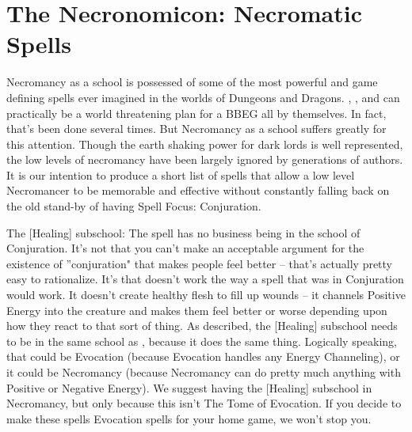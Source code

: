 \section{The Necronomicon: Necromatic Spells}

Necromancy as a school is possessed of some of the most powerful and game defining spells ever imagined in the worlds of Dungeons and Dragons. , , and  can practically be a world threatening plan for a BBEG all by themselves. In fact, that's been done several times. But Necromancy as a school suffers greatly for this attention. Though the earth shaking power for dark lords is well represented, the low levels of necromancy have been largely ignored by generations of authors. It is our intention to produce a short list of spells that allow a low level Necromancer to be memorable and effective without constantly falling back on the old stand-by of having Spell Focus: Conjuration.

The [Healing] subschool:
The spell  has no business being in the school of Conjuration. It's not that you can't make an acceptable argument for the existence of ''conjuration" that makes people feel better -- that's actually pretty easy to rationalize. It's that  doesn't work the way a spell that was in Conjuration would work. It doesn't create healthy flesh to fill up wounds -- it channels Positive Energy into the creature and makes them feel better or worse depending upon how they react to that sort of thing. As described, the [Healing] subschool needs to be in the same school as , because it does the same thing. Logically speaking, that could be Evocation (because Evocation handles any Energy Channeling), or it could be Necromancy (because Necromancy can do pretty much anything with Positive or Negative Energy). We suggest having the [Healing] subschool in Necromancy, but only because this isn't The Tome of Evocation. If you decide to make these spells Evocation spells for your home game, we won't stop you.\\


